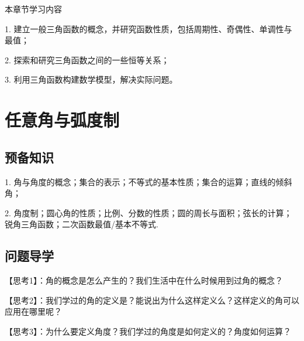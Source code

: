 \makefront
\vspace{-1.5em}
\startexercise

\hspace{-2.5em}
{\hei 本章节学习内容}\par
1. 建立一般三角函数的概念，并研究函数性质，包括周期性、奇偶性、单调性与最值；\par
2. 探索和研究三角函数之间的一些恒等关系；\par
3. 利用三角函数构建数学模型，解决实际问题。\par

\section{任意角与弧度制}
\subsection{预备知识}
1. 角与角度的概念；集合的表示；不等式的基本性质；集合的运算；直线的倾斜角；\par
2. 角度制；圆心角的性质；比例、分数的性质；圆的周长与面积；弦长的计算；锐角三角函数；二次函数最值/基本不等式.\par
\subsection{问题导学}
{\heiti 【思考1】}：角的概念是怎么产生的？我们生活中在什么时候用到过角的概念？\par
\vspace{6em}
{\heiti 【思考2】}：我们学过的角的定义是？能说出为什么这样定义么？这样定义的角可以应用在哪里呢？\par
\vspace{10em}
{\heiti 【思考3】}：为什么要定义角度？我们学过的角度是如何定义的？角度如何运算？\par
\vspace{10em}

%
